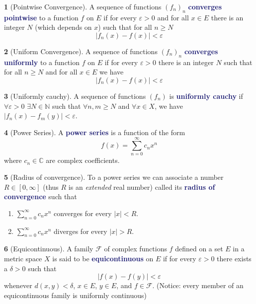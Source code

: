 \documentclass[12pt]{article}
\numberwithin{equation}{section}
\newcommand{\navy}[1]{\textcolor{MidnightBlue}{\bf #1}}
\theoremstyle{plain}
\theoremstyle{definition}
\newtheorem{definition}{\color{MidnightBlue}{\textbf{Definition}}}[section]
\newcommand{\1}{\mathbbm 1}
\def\d{\delta}
\newcommand{\e}{\varepsilon}
\newcommand{\CC}{\mathbb C}
\newcommand{\NN}{\mathbb N}
\newcommand{\fF}{\mathscr F}
\begin{document}
\begin{definition}[Pointwise Convergence]
A sequence of functions $(f_n)_n$ \navy{converges pointwise} to a function $f$ on $E$ if for every $\e > 0$ and for all $x \in E$ there is an integer $N$ (which depends on $x$) such that for all $n \geq N$
\begin{equation*}
|f_n(x) - f(x)| < \e
\end{equation*}
\end{definition}

\begin{definition}[Uniform Convergence]
A sequence of functions $(f_n)_n$ \navy{converges uniformly} to a function $f$ on $E$ if for every $\e > 0$ there is an integer $N$ such that for all $n \geq N$ and for all $x \in E$ we have
\begin{equation*}
|f_n(x) - f(x)| < \e
\end{equation*}
\end{definition}

\begin{definition}[Uniformly cauchy]
A sequence of functions $(f_n)$ is \navy{uniformly cauchy} if $\forall \e > 0$ $\exists N \in \NN$ such that $\forall n,m \geq N$ and $\forall x \in X$, we have $|f_n(x) - f_m(y)| < \e$.
\end{definition}

\begin{definition}[Power Series]
A \navy{power series} is a function of the form
\begin{equation}
f(x) = \sum_{n=0}^\infty c_n x^n
\end{equation}
where $c_n \in \CC$ are complex coefficients.
\end{definition}

\begin{definition}[Radius of convergence]
To a power series we can associate a number $R \in [0, \infty]$ (thus $R$ is an \emph{extended} real number) called its \navy{radius of convergence} such that
\begin{enumerate}
\item $\sum_{n=0}^\infty c_n x^n$ converges for every $|x| < R$.
\item $\sum_{n=0}^\infty c_n x^n$ diverges for every $|x| > R$.
\end{enumerate}
\end{definition}

\begin{definition}[Equicontinuous]
A family $\fF$ of complex functions $f$ defined on a set $E$ in a metric space $X$ is said to be \navy{equicontinuous} on $E$ if for every $\e > 0$ there exists a $\d > 0$ such that
\begin{equation*}
|f(x) - f(y)| < \e
\end{equation*}
whenever $d(x,y) < \d$, $x \in E$, $y \in E$, and $f \in \fF$. (Notice: every member of an equicontinuous family is uniformly continuous)
\end{definition}
\end{document}
